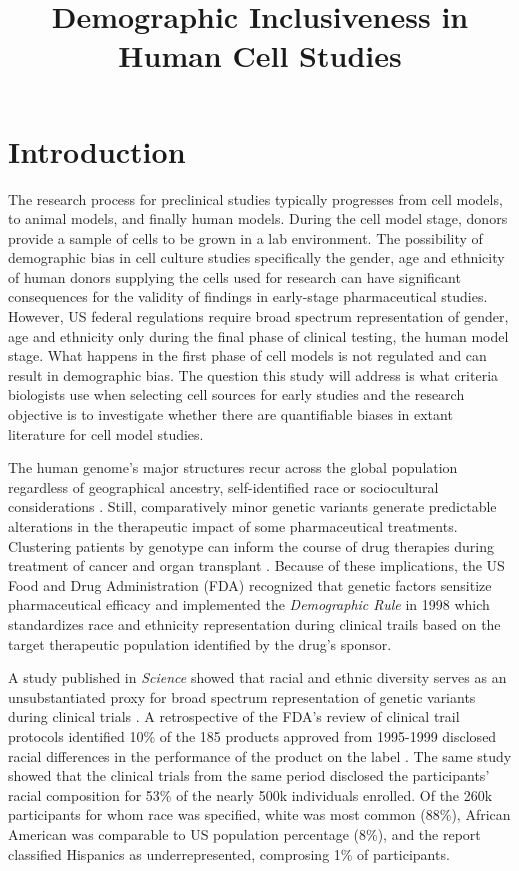\documentclass[10pt]{article}
\title{Demographic Inclusiveness in Human Cell Studies}
\begin{document}
\maketitle
  
\section{Introduction}
  
The research process for preclinical studies typically progresses from cell models, to animal models, and finally human models. During the cell model stage, donors provide a sample of cells to be grown in a lab environment. The possibility of demographic bias in cell culture studies specifically the gender, age and ethnicity of human donors supplying the cells used for research can have significant consequences for the validity of findings in early-stage pharmaceutical studies. However, US federal regulations require broad spectrum representation of gender, age and ethnicity only during the final phase of clinical testing, the human model stage. What happens in the first phase of cell models is not regulated and can result in demographic bias. The question this study will address is what criteria biologists use when selecting cell sources for early studies and the research objective is to investigate whether there are quantifiable biases in extant literature for cell model studies.

The human genome's major structures recur across the global population regardless of geographical ancestry, self-identified race or sociocultural considerations \cite{xie2001molecular, cooper2003race}. Still, comparatively minor genetic variants generate predictable alterations in the therapeutic impact of some pharmaceutical treatments. Clustering patients by genotype can inform the course of drug therapies during treatment of cancer and organ transplant \cite{krynetski2000genetic, higashi2002association}. Because of these implications, the US Food and Drug Administration (FDA) recognized that genetic factors sensitize pharmaceutical efficacy and implemented the \textit{Demographic Rule} in 1998 which standardizes race and ethnicity representation during clinical trails based on the target therapeutic population identified by the drug's sponsor.

A study published in \textit{Science} showed that racial and ethnic diversity serves as an unsubstantiated proxy for broad spectrum representation of genetic variants during clinical trials \cite{haga2003fda}. A retrospective of the FDA's review of clinical trail protocols identified 10\% of the 185 products approved from 1995-1999 disclosed racial differences in the performance of the product on the label \cite{evelyn2001participation}. The same study showed that the clinical trials from the same period disclosed the participants' racial composition for 53\% of the nearly 500k individuals enrolled. Of the 260k participants for whom race was specified, white was most common (88\%), African American was comparable to US population percentage (8\%), and the report classified Hispanics as underrepresented, comprosing 1\% of participants.
\end{document}
